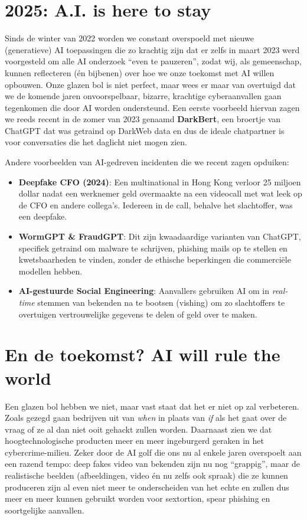 \documentclass[
  10pt,
  dutch,
  paper=a4,
  ,captions=tableheading
]{scrbook}
\providecommand{\tightlist}{%
  \setlength{\itemsep}{0pt}\setlength{\parskip}{0pt}}
\begin{document}
\section{2025: A.I. is here to stay}\label{a.i.-is-here-to-stay}

Sinds de winter van 2022 worden we constant overspoeld met nieuwe
(generatieve) AI toepassingen die zo krachtig zijn dat er zelfs in maart
2023 werd voorgesteld om alle AI onderzoek ``even te pauzeren'', zodat
wij, als gemeenschap, kunnen reflecteren (én bijbenen) over hoe we onze
toekomst met AI willen opbouwen. Onze glazen bol is niet perfect, maar
wees er maar van overtuigd dat we de komende jaren onvoorspelbaar,
bizarre, krachtige cyberaanvallen gaan tegenkomen die door AI worden
ondersteund. Een eerste voorbeeld hiervan zagen we reeds recent in de
zomer van 2023 genaamd \textbf{DarkBert}, een broertje van ChatGPT dat
was getraind op DarkWeb data en dus de ideale chatpartner is voor
conversaties die het daglicht niet mogen zien.

Andere voorbeelden van AI-gedreven incidenten die we recent zagen
opduiken:

\begin{itemize}
\tightlist
\item
  \textbf{Deepfake CFO (2024)}: Een multinational in Hong Kong verloor
  25 miljoen dollar nadat een werknemer geld overmaakte na een videocall
  met wat leek op de CFO en andere collega's. Iedereen in de call,
  behalve het slachtoffer, was een deepfake.
\item
  \textbf{WormGPT \& FraudGPT}: Dit zijn kwaadaardige varianten van
  ChatGPT, specifiek getraind om malware te schrijven, phishing mails op
  te stellen en kwetsbaarheden te vinden, zonder de ethische beperkingen
  die commerciële modellen hebben.
\item
  \textbf{AI-gestuurde Social Engineering}: Aanvallers gebruiken AI om
  in \emph{real-time} stemmen van bekenden na te bootsen (vishing) om zo
  slachtoffers te overtuigen vertrouwelijke gegevens te delen of geld
  over te maken.
\end{itemize}

\section{En de toekomst? AI will rule the
world}\label{en-de-toekomst-ai-will-rule-the-world}

Een glazen bol hebben we niet, maar vast staat dat het er niet op zal
verbeteren. Zoals gezegd gaan bedrijven uit van \emph{when} in plaats
van \emph{if} als het gaat over de vraag of ze al dan niet ooit gehackt
zullen worden. Daarnaast zien we dat hoogtechnologische producten meer
en meer ingeburgerd geraken in het cybercrime-milieu. Zeker door de AI
golf die ons nu al enkele jaren overspoelt aan een razend tempo: deep
fakes video van bekenden zijn nu nog ``grappig'', maar de realistische
beelden (afbeeldingen, video én nu zelfs ook spraak) die ze kunnen
produceren zijn al even niet meer te onderscheiden van het echte en
zullen dus meer en meer kunnen gebruikt worden voor sextortion, spear
phishing en soortgelijke aanvallen.
\end{document}
